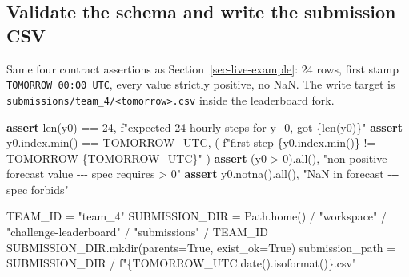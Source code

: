\documentclass[
  english,
  letterpaper,
]{scrbook}
\newenvironment{Shaded}{\begin{snugshade}}{\end{snugshade}}
\newcommand{\BuiltInTok}[1]{\textcolor[rgb]{0.00,0.23,0.31}{#1}}
\newcommand{\ControlFlowTok}[1]{\textcolor[rgb]{0.00,0.23,0.31}{\textbf{#1}}}
\newcommand{\DecValTok}[1]{\textcolor[rgb]{0.68,0.00,0.00}{#1}}
\newcommand{\NormalTok}[1]{\textcolor[rgb]{0.00,0.23,0.31}{#1}}
\newcommand{\OperatorTok}[1]{\textcolor[rgb]{0.37,0.37,0.37}{#1}}
\newcommand{\SpecialCharTok}[1]{\textcolor[rgb]{0.37,0.37,0.37}{#1}}
\newcommand{\SpecialStringTok}[1]{\textcolor[rgb]{0.13,0.47,0.30}{#1}}
\newcommand{\StringTok}[1]{\textcolor[rgb]{0.13,0.47,0.30}{#1}}
\newcommand{\VariableTok}[1]{\textcolor[rgb]{0.07,0.07,0.07}{#1}}
\begin{document}
\subsection{Validate the schema and write the submission
CSV}\label{sec-team4-write}

Same four contract assertions as Section~\ref{sec-live-example}: 24
rows, first stamp \texttt{TOMORROW\ 00:00\ UTC}, every value strictly
positive, no NaN. The write target is
\texttt{submissions/team\_4/\textless{}tomorrow\textgreater{}.csv}
inside the leaderboard fork.

\begin{Shaded}
\begin{Highlighting}[]
\ControlFlowTok{assert} \BuiltInTok{len}\NormalTok{(y0) }\OperatorTok{==} \DecValTok{24}\NormalTok{,           }\SpecialStringTok{f"expected 24 hourly steps for y\_0, got }\SpecialCharTok{\{}\BuiltInTok{len}\NormalTok{(y0)}\SpecialCharTok{\}}\SpecialStringTok{"}
\ControlFlowTok{assert}\NormalTok{ y0.index.}\BuiltInTok{min}\NormalTok{() }\OperatorTok{==}\NormalTok{ TOMORROW\_UTC, (}
    \SpecialStringTok{f"first step }\SpecialCharTok{\{}\NormalTok{y0}\SpecialCharTok{.}\NormalTok{index}\SpecialCharTok{.}\BuiltInTok{min}\NormalTok{()}\SpecialCharTok{\}}\SpecialStringTok{ != TOMORROW }\SpecialCharTok{\{}\NormalTok{TOMORROW\_UTC}\SpecialCharTok{\}}\SpecialStringTok{"}
\NormalTok{)}
\ControlFlowTok{assert}\NormalTok{ (y0 }\OperatorTok{\textgreater{}} \DecValTok{0}\NormalTok{).}\BuiltInTok{all}\NormalTok{(),          }\StringTok{"non{-}positive forecast value {-}{-}{-} spec requires \textgreater{} 0"}
\ControlFlowTok{assert}\NormalTok{ y0.notna().}\BuiltInTok{all}\NormalTok{(),        }\StringTok{"NaN in forecast {-}{-}{-} spec forbids"}

\NormalTok{TEAM\_ID }\OperatorTok{=} \StringTok{"team\_4"}
\NormalTok{SUBMISSION\_DIR }\OperatorTok{=}\NormalTok{ Path.home() }\OperatorTok{/} \StringTok{"workspace"} \OperatorTok{/} \StringTok{"challenge{-}leaderboard"} \OperatorTok{/} \StringTok{"submissions"} \OperatorTok{/}\NormalTok{ TEAM\_ID}
\NormalTok{SUBMISSION\_DIR.mkdir(parents}\OperatorTok{=}\VariableTok{True}\NormalTok{, exist\_ok}\OperatorTok{=}\VariableTok{True}\NormalTok{)}
\NormalTok{submission\_path }\OperatorTok{=}\NormalTok{ SUBMISSION\_DIR }\OperatorTok{/} \SpecialStringTok{f"}\SpecialCharTok{\{}\NormalTok{TOMORROW\_UTC}\SpecialCharTok{.}\NormalTok{date()}\SpecialCharTok{.}\NormalTok{isoformat()}\SpecialCharTok{\}}\SpecialStringTok{.csv"}


\end{Highlighting}
\end{Shaded}
\end{document}

